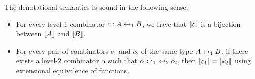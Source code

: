 

\begin{theorem}\label{thm:semone}
  The denotational semantics is sound in the following sense:
  \begin{itemize}
    \item For every level-1 combinator $c : A \leftrightarrow_1 B$, we have that $\llbracket c\rrbracket$ is a bijection between $\llbracket A\rrbracket$ and $\llbracket B\rrbracket$.
      \item For every pair of combinators $c_1$ and $c_2$ of the same type $A \leftrightarrow_1 B$, if there exists a level-2
        combinator $\alpha$ such that $\alpha : c_1 \leftrightarrow_2 c_2$, then $\llbracket c_1\rrbracket = \llbracket c_2\rrbracket$ using
        extensional equivalence of functions.
  \end{itemize}
\end{theorem}


